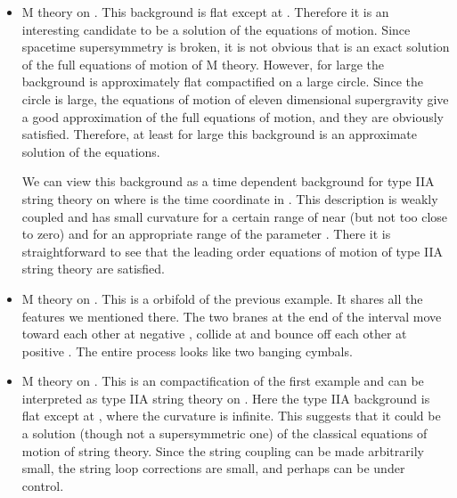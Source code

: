 \documentclass[a4paper,12pt,oneside]{article}
\begin{document}
\begin{itemize}
\item
M theory on \coordHE{}.  This background is flat
except at \coordHE{}.  Therefore it is an interesting candidate to be a
solution of the equations of motion.  Since spacetime
supersymmetry is broken, it is not obvious that \coordHE{} is an exact solution of the full equations of motion of M
theory.  However, for large \coordHE{} the background is approximately
flat \coordHE{} compactified on a large circle. Since the circle
is large, the equations of motion of eleven dimensional
supergravity give a good approximation of the full equations of
motion, and they are obviously satisfied.  Therefore, at least
for large \coordHE{} this background is an approximate solution of the
equations.

We can view this background as a time dependent background for
type IIA string theory on \coordHE{} where \coordHE{} is the time
coordinate in \coordHE{}. This description is weakly coupled
and has small curvature for a certain range of \coordHE{} near \coordHE{} (but not too close to zero) and for an appropriate range of the
parameter \coordHE{}.  There it is straightforward to see that the
leading order equations of motion of type IIA string theory are
satisfied.

\item
M theory on \coordHE{}.  This is a \coordHE{} orbifold
of the previous example.  It shares all the features we mentioned
there.  The two branes at the end of the interval move toward
each other at negative \coordHE{}, collide at \coordHE{} and bounce off each
other at positive \coordHE{}.  The entire process looks like two banging
cymbals.

\item
M theory on \coordHE{}.  This is an \coordHE{}
compactification of the first example and can be interpreted as
type IIA string theory on \coordHE{}.  Here the type
IIA background is flat except at \coordHE{}, where the curvature is
infinite. This suggests that it could be a solution (though not a
supersymmetric one) of the classical equations of motion of string
theory. Since the string coupling can be made arbitrarily small,
the string loop corrections are small, and perhaps can be under
control.

\end{itemize}
\end{document}
